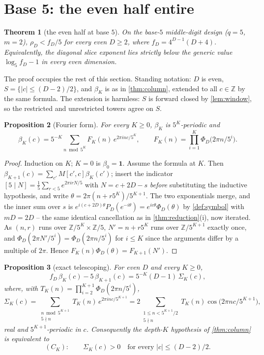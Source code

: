 \documentclass[11pt]{amsart}
\newtheorem{theorem}{Theorem}[section]
\newtheorem{proposition}[theorem]{Proposition}
\theoremstyle{definition}
\theoremstyle{remark}
\begin{document}
\section{Base 5: the even half entire}
\label{sec:base5}

\begin{theorem}[the even half at base $5$]
\label{thm:base5}
On the base-$5$ middle-digit design ($q = 5$, $m = 2$), $\rho_D < f_D/5$ for every even $D \ge 2$, where $f_D = 4^{D-1}(D+4)$. Equivalently, the diagonal slice exponent lies strictly below the generic value $\log_5 f_D - 1$ in every even dimension.
\end{theorem}

The proof occupies the rest of this section. Standing notation: $D$ is even, $S = \{\lvert c\rvert \le (D-2)/2\}$, and $\beta_K$ is as in \cref{thm:column}, extended to all $c \in \mathbb{Z}$ by the same formula. The extension is harmless: $S$ is forward closed by \cref{lem:window}, so the restricted and unrestricted towers agree on $S$.

\begin{proposition}[Fourier form]
\label{prop:fourier5}
For every $K \ge 0$, $\beta_K$ is $5^K$-periodic and
\[
  \beta_K(c) = 5^{-K}\sum_{n \bmod 5^K} F_K(n)\,e^{2\pi i nc/5^K}, \qquad F_K(n) = \prod_{i=1}^{K}\Phi_D\bigl(2\pi n/5^i\bigr).
\]
\end{proposition}

\begin{proof}
Induction on $K$; $K = 0$ is $\beta_0 = \mathbf 1$. Assume the formula at $K$. Then $\beta_{K+1}(c) = \sum_{c'}M[c',c]\beta_K(c')$; insert the indicator $[5 \mid N] = \tfrac15\sum_{r<5}e^{2\pi irN/5}$ with $N = c + 2D - s$ \emph{before} substituting the inductive hypothesis, and write $\theta = 2\pi(n + r5^K)/5^{K+1}$. The two exponentials merge, and the inner sum over $s$ is $e^{i(c+2D)\theta}P_D(e^{-i\theta}) = e^{ic\theta}\Phi_D(\theta)$ by \cref{def:symbol} with $mD = 2D$ -- the same identical cancellation as in \cref{thm:reduction}(i), now iterated. As $(n,r)$ runs over $\mathbb{Z}/5^K \times \mathbb{Z}/5$, $N' = n + r5^K$ runs over $\mathbb{Z}/5^{K+1}$ exactly once, and $\Phi_D(2\pi N'/5^i) = \Phi_D(2\pi n/5^i)$ for $i \le K$ since the arguments differ by a multiple of $2\pi$. Hence $F_K(n)\Phi_D(\theta) = F_{K+1}(N')$.
\end{proof}

\begin{proposition}[exact telescoping]
\label{prop:tele5}
For even $D$ and every $K \ge 0$,
\[
  f_D\,\beta_K(c) - 5\,\beta_{K+1}(c) = 5^{-K}(D-1)\,\Sigma_K(c),
\]
where, with $T_K(n) = \prod_{i=2}^{K+1}\Phi_D(2\pi n/5^i)$,
\[
  \Sigma_K(c) = \sum_{\substack{n \bmod 5^{K+1} \\ 5 \nmid n}} T_K(n)\,e^{2\pi inc/5^{K+1}} = 2\!\!\sum_{\substack{1 \le n < 5^{K+1}/2 \\ 5 \nmid n}}\!\! T_K(n)\cos\!\bigl(2\pi nc/5^{K+1}\bigr),
\]
real and $5^{K+1}$-periodic in $c$. Consequently the depth-$K$ hypothesis of \cref{thm:column} is \emph{equivalent} to
\[
  (C_K): \qquad \Sigma_K(c) > 0 \quad\text{for every } \lvert c\rvert \le (D-2)/2.
\]
\end{proposition}
\end{document}
